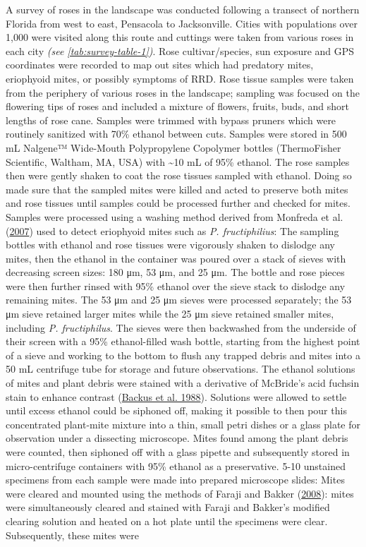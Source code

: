 \documentclass{ufdissertation}[overrideChapters] %
\begin{document}
{A survey of roses in the landscape was conducted following a transect of northern Florida from west to east, Pensacola to Jacksonville. Cities with populations over 1,000 were visited along this route and cuttings were taken from various roses in each city \emph{(see \ref{tab:survey-table-1})}. Rose cultivar/species, sun exposure and GPS coordinates were recorded to map out sites which had predatory mites, eriophyoid mites, or possibly symptoms of RRD. Rose tissue samples were taken from the periphery of various roses in the landscape; sampling was focused on the flowering tips of roses and included a mixture of flowers, fruits, buds, and short lengths of rose cane. Samples were trimmed with bypass pruners which were routinely sanitized with 70\% ethanol between cuts. Samples were stored in 500 \si{\milli\liter} Nalgene™ Wide-Mouth Polypropylene Copolymer bottles (ThermoFisher Scientific, Waltham, MA, USA) with \textasciitilde10 \si{\milli\liter} of 95\% ethanol. The rose samples then were gently shaken to coat the rose tissues sampled with ethanol. Doing so made sure that the sampled mites were killed and acted to preserve both mites and rose tissues until samples could be processed further and checked for mites. Samples were processed using a washing method derived from Monfreda et al. (\protect\hyperlink{ref-Monfreda2007}{2007}) used to detect eriophyoid mites such as \emph{P. fructiphilius}: The sampling bottles with ethanol and rose tissues were vigorously shaken to dislodge any mites, then the ethanol in the container was poured over a stack of sieves with decreasing screen sizes: 180 \si{\micro\metre}, 53 \si{\micro\metre}, and 25 \si{\micro\metre}. The bottle and rose pieces were then further rinsed with 95\% ethanol over the sieve stack to dislodge any remaining mites. The 53 \si{\micro\metre} and 25 \si{\micro\metre} sieves were processed separately; the 53 \si{\micro\metre} sieve retained larger mites while the 25 \si{\micro\metre} sieve retained smaller mites, including \emph{P. fructiphilus}. The sieves were then backwashed from the underside of their screen with a 95\% ethanol-filled wash bottle, starting from the highest point of a sieve and working to the bottom to flush any trapped debris and mites into a 50 \si{\milli\liter} centrifuge tube for storage and future observations. The ethanol solutions of mites and plant debris were stained with a derivative of McBride's acid fuchsin stain to enhance contrast (\protect\hyperlink{ref-Backus1988}{Backus et al. 1988}). Solutions were allowed to settle until excess ethanol could be siphoned off, making it possible to then pour this concentrated plant-mite mixture into a thin, small petri dishes or a glass plate for observation under a dissecting microscope. Mites found among the plant debris were counted, then siphoned off with a glass pipette and subsequently stored in micro-centrifuge containers with 95\% ethanol as a preservative. 5-10 unstained specimens from each sample were made into prepared microscope slides: Mites were cleared and mounted using the methods of Faraji and Bakker (\protect\hyperlink{ref-Faraji2008}{2008}): mites were simultaneously cleared and stained with Faraji and Bakker's modified clearing solution and heated on a hot plate until the specimens were clear. Subsequently, these mites were }
\end{document}
